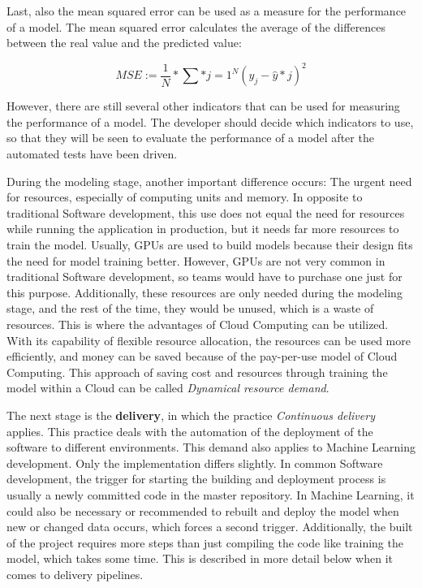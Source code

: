 \documentclass[12pt,english,a4paper,oneside,,tablecaptionabove]{scrbook}
\begin{document}
Last, also the mean squared error can be used as a measure for the
performance of a model. The mean squared error calculates the average of
the differences between the real value and the predicted value:

\begin{equation}

MSE := \frac{1}{N} * \sum*{j=1}^{N}{(y_j - \hat{y}*j)^2}

\end{equation}

However, there are still several other indicators that can be used for
measuring the performance of a model. The developer should decide which
indicators to use, so that they will be seen to evaluate the performance
of a model after the automated tests have been driven.

During the modeling stage, another important difference occurs: The
urgent need for resources, especially of computing units and memory. In
opposite to traditional Software development, this use does not equal
the need for resources while running the application in production, but
it needs far more resources to train the model. Usually, \acs{GPU}s are
used to build models because their design fits the need for model
training better. However, \acs{GPU}s are not very common in traditional
Software development, so teams would have to purchase one just for this
purpose. Additionally, these resources are only needed during the
modeling stage, and the rest of the time, they would be unused, which is
a waste of resources. This is where the advantages of Cloud Computing
can be utilized. With its capability of flexible resource allocation,
the resources can be used more efficiently, and money can be saved
because of the pay-per-use model of Cloud Computing. This approach of
saving cost and resources through training the model within a Cloud can
be called \emph{Dynamical resource demand}.

The next stage is the \textbf{delivery}, in which the practice
\emph{Continuous delivery} applies. This practice deals with the
automation of the deployment of the software to different environments.
This demand also applies to Machine Learning development. Only the
implementation differs slightly. In common Software development, the
trigger for starting the building and deployment process is usually a
newly committed code in the master repository. In Machine Learning, it
could also be necessary or recommended to rebuilt and deploy the model
when new or changed data occurs, which forces a second trigger.
Additionally, the built of the project requires more steps than just
compiling the code like training the model, which takes some time. This
is described in more detail below when it comes to delivery pipelines.
\end{document}
